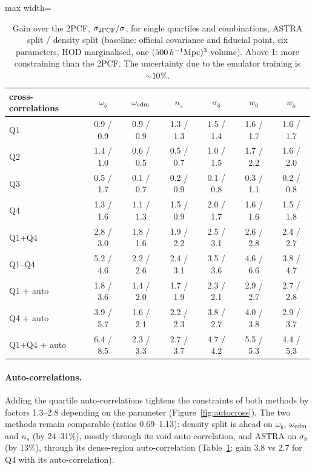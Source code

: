 \begin{table}[!tp]
\centering\small
\begin{adjustbox}{max width=\textwidth}
\begin{tabular}{lcccccc}
\toprule
cross-correlations & $\omega_b$ & $\omega_{\rm cdm}$ & $n_s$ & $\sigma_8$ & $w_0$ & $w_a$ \\
\midrule
Q1 & 0.9 / 0.9 & 0.9 / 0.9 & 1.3 / 1.3 & 1.5 / 1.4 & 1.6 / 1.7 & 1.6 / 1.7 \\
Q2 & 1.4 / 1.0 & 0.6 / 0.5 & 0.5 / 0.7 & 1.0 / 1.5 & 1.7 / 2.2 & 1.6 / 2.0 \\
Q3 & 0.5 / 1.7 & 0.1 / 0.7 & 0.2 / 0.9 & 0.1 / 0.8 & 0.3 / 1.1 & 0.2 / 0.8 \\
Q4 & 1.3 / 1.6 & 1.1 / 1.3 & 1.5 / 0.9 & 2.0 / 1.7 & 1.6 / 1.6 & 1.5 / 1.8 \\
Q1+Q4 & 2.8 / 3.0 & 1.8 / 1.6 & 1.9 / 2.2 & 2.5 / 3.1 & 2.6 / 2.8 & 2.4 / 2.7 \\
Q1--Q4 & 5.2 / 4.6 & 2.2 / 2.6 & 2.4 / 3.1 & 3.5 / 3.6 & 4.6 / 6.6 & 3.8 / 4.7 \\
Q1 + auto & 1.8 / 3.6 & 1.4 / 2.0 & 1.7 / 1.9 & 2.3 / 2.1 & 2.9 / 2.7 & 2.7 / 2.8 \\
Q4 + auto & 3.9 / 5.7 & 1.6 / 2.1 & 2.2 / 2.3 & 3.8 / 2.7 & 4.0 / 3.8 & 2.9 / 3.7 \\
Q1+Q4 + auto & 6.4 / 8.5 & 2.3 / 3.3 & 2.7 / 3.7 & 4.7 / 4.2 & 5.5 / 5.3 & 4.4 / 5.3 \\
\bottomrule
\end{tabular}
\end{adjustbox}
\caption{Gain over the 2PCF, $\sigma_{\rm 2PCF}/\sigma$, for single quartiles and combinations, ASTRA split / density split (baseline: official covariance and fiducial point, six parameters, HOD marginalised, one $(500\,h^{-1}\mathrm{Mpc})^3$ volume). Above 1: more constraining than the 2PCF. The uncertainty due to the emulator training is $\sim10\%$.}
\label{tab:breakdown}
\end{table}

\paragraph{Auto-correlations.} Adding the quartile auto-correlations tightens the constraints of both methods by factors 1.3--2.8 depending on the parameter (Figure~\ref{fig:autocross}). The two methods remain comparable (ratios 0.69--1.13): density split is ahead on $\omega_b$, $\omega_{\rm cdm}$ and $n_s$ (by 24--31\%), mostly through its void auto-correlation, and ASTRA on $\sigma_8$ (by 13\%), through its dense-region auto-correlation (Table~\ref{tab:breakdown}: gain 3.8 vs 2.7 for Q4 with its auto-correlation).

